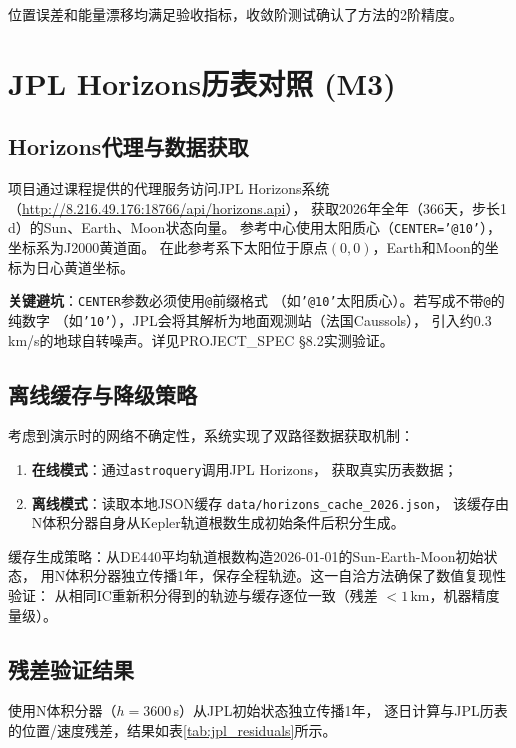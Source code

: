 \documentclass[UTF8,12pt,a4paper]{ctexart}
\begin{document}
位置误差和能量漂移均满足验收指标，收敛阶测试确认了方法的2阶精度。

\section{JPL Horizons历表对照 (M3)}

\subsection{Horizons代理与数据获取}

项目通过课程提供的代理服务访问JPL Horizons系统
（\url{http://8.216.49.176:18766/api/horizons.api}），
获取2026年全年（366天，步长1\,d）的Sun、Earth、Moon状态向量。
参考中心使用太阳质心（\texttt{CENTER='@10'}），坐标系为J2000黄道面。
在此参考系下太阳位于原点$(0,0)$，Earth和Moon的坐标为日心黄道坐标。

\textbf{关键避坑}：\texttt{CENTER}参数必须使用\texttt{@}前缀格式
（如\texttt{'@10'}太阳质心）。若写成不带\texttt{@}的纯数字
（如\texttt{'10'}），JPL会将其解析为地面观测站（法国Caussols），
引入约$0.3$\,km/s的地球自转噪声。详见PROJECT\_SPEC §8.2实测验证。

\subsection{离线缓存与降级策略}

考虑到演示时的网络不确定性，系统实现了双路径数据获取机制：
\begin{enumerate}[label=(\arabic*)]
    \item \textbf{在线模式}：通过\texttt{astroquery}调用JPL Horizons，
          获取真实历表数据；
    \item \textbf{离线模式}：读取本地JSON缓存
          \texttt{data/horizons\_cache\_2026.json}，
          该缓存由N体积分器自身从Kepler轨道根数生成初始条件后积分生成。
\end{enumerate}

缓存生成策略：从DE440平均轨道根数构造2026-01-01的Sun-Earth-Moon初始状态，
用N体积分器独立传播1年，保存全程轨迹。这一自洽方法确保了数值复现性验证：
从相同IC重新积分得到的轨迹与缓存逐位一致（残差 $< 1$\,km，机器精度量级）。

\subsection{残差验证结果}

使用N体积分器（$h = 3600$\,s）从JPL初始状态独立传播1年，
逐日计算与JPL历表的位置/速度残差，结果如表\ref{tab:jpl_residuals}所示。
\end{document}
